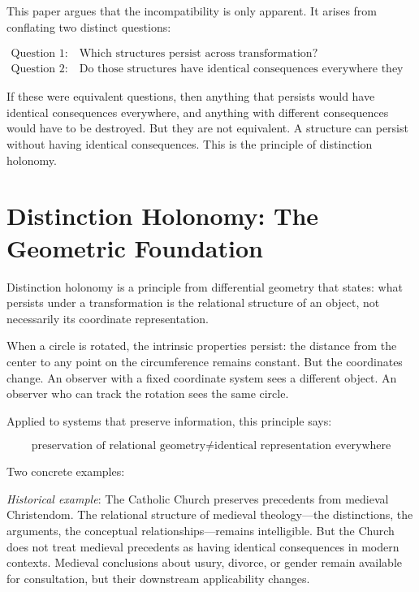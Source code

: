 \documentclass[12pt]{article}
\begin{document}
This paper argues that the incompatibility is only apparent. It arises from conflating two distinct questions:

\begin{equation}
\begin{aligned}
\text{Question 1: } &\text{Which structures persist across transformation?}\\
\text{Question 2: } &\text{Do those structures have identical consequences everywhere they persist?}
\end{aligned}
\end{equation}

If these were equivalent questions, then anything that persists would have identical consequences everywhere, and anything with different consequences would have to be destroyed. But they are not equivalent. A structure can persist without having identical consequences. This is the principle of distinction holonomy.

\section{Distinction Holonomy: The Geometric Foundation}

Distinction holonomy is a principle from differential geometry that states: what persists under a transformation is the relational structure of an object, not necessarily its coordinate representation.

When a circle is rotated, the intrinsic properties persist: the distance from the center to any point on the circumference remains constant. But the coordinates change. An observer with a fixed coordinate system sees a different object. An observer who can track the rotation sees the same circle.

Applied to systems that preserve information, this principle says:

\begin{equation}
\boxed{\text{preservation of relational geometry} \neq \text{identical representation everywhere}}
\end{equation}

Two concrete examples:

\textit{Historical example}: The Catholic Church preserves precedents from medieval Christendom. The relational structure of medieval theology---the distinctions, the arguments, the conceptual relationships---remains intelligible. But the Church does not treat medieval precedents as having identical consequences in modern contexts. Medieval conclusions about usury, divorce, or gender remain available for consultation, but their downstream applicability changes.
\end{document}
